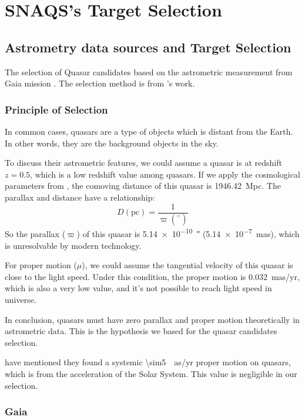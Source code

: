 \chapter{SNAQS's Target Selection}
\label{sec:selection}

\section{Astrometry data sources and Target Selection}

The selection of Quasar candidates based on the astrometric measurement from Gaia mission \citep{gaiacollaborationGaiaMission2016}. The selection method is from \citet{heintz_study_2015}'s work.

\subsection{Principle of Selection}

In common cases, quasars are a type of objects which is distant from the Earth. In other words, they are the background objects in the sky. 

To discuss their astrometric features, we could assume a quasar is at redshift $z=0.5$, which is a low redshift value among quasars. If we apply the cosmological parameters from \citet{planckcollaborationPlanck2018Results2020f,planckcollaborationPlanck2018Results2021}, the comoving distance of this quasar is \qty{1946.42}{Mpc}. The parallax and distance have a relationship:\[D (\mathrm{pc}) = \frac{1}{\varpi (^{\prime\prime})}\] So the parallax ($\varpi$) of this quasar is \qty{5.14e-10}{\arcsecond} (\qty{5.14e-7}{mas}), which is unresolvable by modern technology. 

For proper motion ($\mu$), we could assume the tangential velocity of this quasar is close to the light speed. Under this condition, the proper motion is \qty{0.032}{mas/yr}, which is also a very low value, and it's not possible to reach light speed in universe.

In conclusion, quasars must have zero parallax and proper motion theoretically in astrometric data. This is the hypothesis we based for the quasar candidates selection.

\citet{gaiacollaborationGaiaEarlyData2021} have mentioned they found a systemic \qty{\sim5}{\mu as/yr} proper motion on quasars, which is from the acceleration of the Solar System. This value is negligible in our selection.

\subsection{Gaia}

